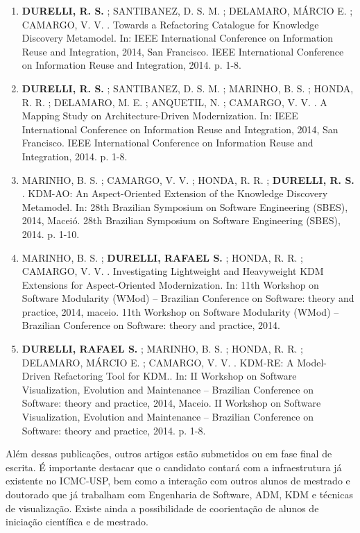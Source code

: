 \documentclass[12pt]{article}
\begin{document}
\begin{itemize}
\begin{enumerate}
		\item \textbf{DURELLI, R. S.} ; SANTIBANEZ, D. S. M. ; DELAMARO, MÁRCIO E. ; CAMARGO, V. V. . Towards a Refactoring Catalogue for Knowledge Discovery Metamodel. In: IEEE International Conference on Information Reuse and Integration, 2014, San Francisco. IEEE International Conference on Information Reuse and Integration, 2014. p. 1-8.
		
		\item \textbf{DURELLI, R. S.} ; SANTIBANEZ, D. S. M. ; MARINHO, B. S. ; HONDA, R. R. ; DELAMARO, M. E. ; ANQUETIL, N. ; CAMARGO, V. V. . A Mapping Study on Architecture-Driven Modernization. In: IEEE International Conference on Information Reuse and Integration, 2014, San Francisco. IEEE International Conference on Information Reuse and Integration, 2014. p. 1-8.
		
		\item MARINHO, B. S. ; CAMARGO, V. V. ; HONDA, R. R. ; \textbf{DURELLI, R. S.} . KDM-AO: An Aspect-Oriented Extension of the Knowledge Discovery Metamodel. In: 28th Brazilian Symposium on Software Engineering (SBES), 2014, Maceió. 28th Brazilian Symposium on Software Engineering (SBES), 2014. p. 1-10.
		
		\item MARINHO, B. S. ; \textbf{DURELLI, RAFAEL S.} ; HONDA, R. R. ; CAMARGO, V. V. . Investigating Lightweight and Heavyweight KDM Extensions for Aspect-Oriented Modernization. In: 11th Workshop on Software Modularity (WMod) -- Brazilian Conference on Software: theory and practice, 2014, maceio. 11th Workshop on Software Modularity (WMod) -- Brazilian Conference on Software: theory and practice, 2014.
		
		\item \textbf{DURELLI, RAFAEL S.} ; MARINHO, B. S. ; HONDA, R. R. ; DELAMARO, MÁRCIO E. ; CAMARGO, V. V. . KDM-RE: A Model-Driven Refactoring Tool for KDM.. In: II Workshop on Software Visualization, Evolution and Maintenance -- Brazilian Conference on Software: theory and practice, 2014, Maceio. II Workshop on Software Visualization, Evolution and Maintenance -- Brazilian Conference on Software: theory and practice, 2014. p. 1-8.

\end{enumerate}
\end{itemize}

Além dessas publicações, outros artigos estão submetidos ou em fase final de escrita. É importante destacar que o candidato contará com a infraestrutura já existente no ICMC-USP, bem como a interação com outros alunos de mestrado e doutorado que já trabalham com Engenharia de Software, ADM, KDM e técnicas de visualização. Existe ainda a possibilidade de coorientação de alunos de iniciação científica e de mestrado.
\end{document}
